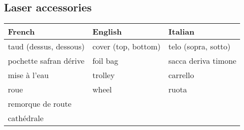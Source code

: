 \documentclass[a4paper, 12pt, twoside]{article}
\begin{document}
    \begin{indt}{\section{Laser accessories}} %
        \begin{tabular}{|l|l|l|}
            \hline %
            \textbf{French}
            & \textbf{English}
            & \textbf{Italian}
            \\
            \hline
            \hline %
            taud (dessus, dessous) %
            & cover (top, bottom)
            & telo (sopra, sotto)
            \\
            \hline %
            pochette safran dérive %
            & foil bag
            & sacca deriva timone
            \\
            \hline %
            mise à l'eau %
            & trolley
            & carrello
            \\
            \hline %
            roue %
            & wheel
            & ruota
            \\
            \hline %
            remorque de route %
            &
            &
            \\
            \hline %
            cathédrale %
            &
            &
            \\
            \hline %
        \end{tabular}
    \end{indt} %
\end{document}
